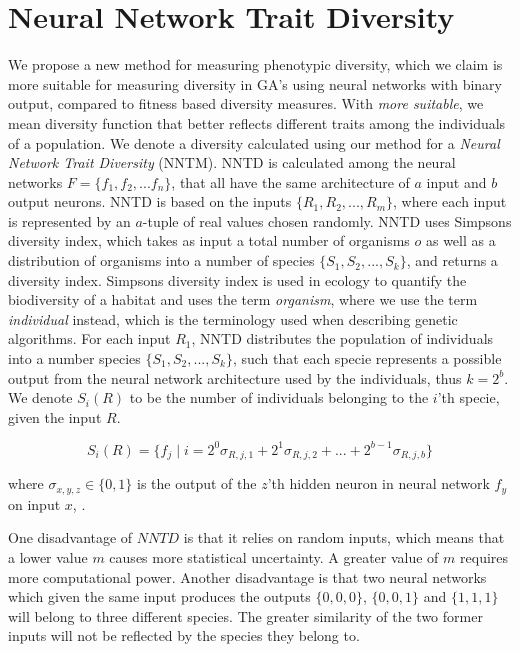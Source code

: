 \section{Neural Network Trait Diversity}
We propose a new method for measuring phenotypic diversity, which we claim is more suitable for measuring diversity in GA's using neural networks with binary output, compared to fitness based diversity measures. With \emph{more suitable}, we mean diversity function that better reflects different traits among the individuals of a population. 
We denote a diversity calculated using our method for a \emph{Neural Network Trait Diversity} (NNTM).
NNTD is calculated among the neural networks $F = \{f_1, f_2, ... f_n\}$, that all have the same architecture of $a$ input and $b$ output neurons. NNTD is based on the inputs $\{R_1, R_2, ..., R_m\}$, where each input is represented by an $a$-tuple of real values chosen randomly. NNTD uses Simpsons diversity index, which takes as input a total number of organisms $o$ as well as a distribution of organisms into a number of species $\{S_1, S_2, ..., S_k\}$, and returns a diversity index. Simpsons diversity index is used in ecology to quantify the biodiversity of a habitat and uses the term \emph{organism}, where we use the term \emph{individual} instead, which is the terminology used when describing genetic algorithms. 
For each input $R_1$, NNTD distributes the population of individuals into a number species $\{S_1, S_2, ..., S_k\}$, such that  each specie represents a possible output from the neural network architecture used by the individuals, thus $k = 2^b$. We denote $S_i(R)$ to be the number of individuals belonging to the $i$'th specie, given the input $R$.

\[S_i(R) = \{f_j \; | \; i = 2^0\sigma_{R,j,1} + 2^1\sigma_{R,j,2} + ... + 2^{b-1}\sigma_{R,j,b} \}\]

where $\sigma_{x,y,z} \in \{0, 1\}$ is the output of the $z$'th hidden neuron in neural network $f_y$ on input $x$, .

One disadvantage of $NNTD$ is that it relies on random inputs, which means that a lower value $m$ causes more statistical uncertainty. A greater value of $m$ requires more computational power.
Another disadvantage is that two neural networks which given the same input produces the outputs $\{0, 0, 0\}$, $\{0, 0, 1\}$ and $\{1, 1, 1\}$ will belong to three different species. The greater similarity of the two former inputs will not be reflected by the species they belong to.
